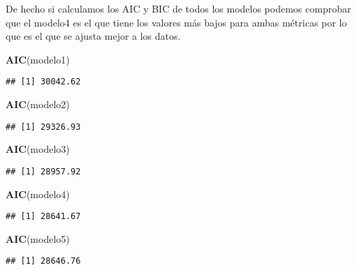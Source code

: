 \documentclass[]{article}
\newenvironment{Shaded}{\begin{snugshade}}{\end{snugshade}}
\newcommand{\KeywordTok}[1]{\textcolor[rgb]{0.13,0.29,0.53}{\textbf{#1}}}
\newcommand{\NormalTok}[1]{#1}
\begin{document}
De hecho si calculamos los AIC y BIC de todos los modelos podemos
comprobar que el modelo4 es el que tiene los valores más bajos para
ambas métricas por lo que es el que se ajusta mejor a los datos.

\begin{Shaded}
\begin{Highlighting}[]
\KeywordTok{AIC}\NormalTok{(modelo1)}
\end{Highlighting}
\end{Shaded}

\begin{verbatim}
## [1] 30042.62
\end{verbatim}

\begin{Shaded}
\begin{Highlighting}[]
\KeywordTok{AIC}\NormalTok{(modelo2)}
\end{Highlighting}
\end{Shaded}

\begin{verbatim}
## [1] 29326.93
\end{verbatim}

\begin{Shaded}
\begin{Highlighting}[]
\KeywordTok{AIC}\NormalTok{(modelo3)}
\end{Highlighting}
\end{Shaded}

\begin{verbatim}
## [1] 28957.92
\end{verbatim}

\begin{Shaded}
\begin{Highlighting}[]
\KeywordTok{AIC}\NormalTok{(modelo4)}
\end{Highlighting}
\end{Shaded}

\begin{verbatim}
## [1] 28641.67
\end{verbatim}

\begin{Shaded}
\begin{Highlighting}[]
\KeywordTok{AIC}\NormalTok{(modelo5)}
\end{Highlighting}
\end{Shaded}

\begin{verbatim}
## [1] 28646.76
\end{verbatim}
\end{document}
